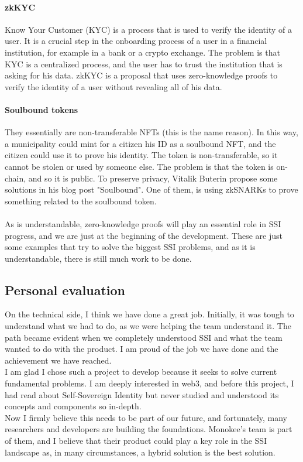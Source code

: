 \paragraph{zkKYC} Know Your Customer (KYC) is a process that is used to verify the identity 
of a user. It is a crucial step in the onboarding process of a user in a financial 
institution, for example in a bank or a crypto exchange. The problem is that KYC is a 
centralized process, and the user has to trust the institution that is asking for his
data. zkKYC is a proposal that uses zero-knowledge proofs to verify the identity of a user
without revealing all of his data.

\paragraph{Soulbound tokens} They essentially are non-transferable NFTs (this is the name 
reason). In this way, a municipality could mint for a citizen his ID as a soulbound NFT, 
and the citizen could use it to prove his identity. The token is non-transferable, so it 
cannot be stolen or used by someone else. The problem is that the token is on-chain, and 
so it is public. To preserve privacy, Vitalik Buterin propose some solutions in his blog 
post "Soulbound". One of them, is using zkSNARKs to prove something related to the 
soulbound token.
\\\\
As is understandable, zero-knowledge proofs will play an essential role in SSI progress, 
and we are just at the beginning of the development. These are just some examples that try to solve the 
biggest SSI problems, and as it is understandable, there is still much work to be done.

\subsection{Personal evaluation}
On the technical side, I think we have done a great job. Initially, it was tough to 
understand what we had to do, as we were helping the team understand it. The path became 
evident when we completely understood SSI and what the team wanted to do with the product.
I am proud of the job we have done and the achievement we have reached.\\
I am glad I chose such a project to develop because it seeks to solve current fundamental
problems. I am deeply interested in web3, and before this project, I had read about 
Self-Sovereign Identity but never studied and understood its concepts and components so 
in-depth.\\
Now I firmly believe this needs to be part of our future, and fortunately, many researchers 
and developers are building the foundations. Monokee's team is part of them, and I believe 
that their product could play a key role in the SSI landscape as, in many circumstances, 
a hybrid solution is the best solution.\\